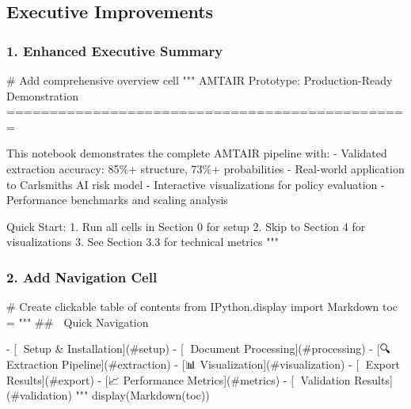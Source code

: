 \documentclass[
  11pt,
  letterpaper,
]{book}
\newenvironment{Shaded}{\begin{snugshade}}{\end{snugshade}}
\newcommand{\CommentTok}[1]{\textcolor[rgb]{0.37,0.37,0.37}{#1}}
\newcommand{\ImportTok}[1]{\textcolor[rgb]{0.00,0.46,0.62}{#1}}
\newcommand{\NormalTok}[1]{\textcolor[rgb]{0.00,0.23,0.31}{#1}}
\newcommand{\OperatorTok}[1]{\textcolor[rgb]{0.37,0.37,0.37}{#1}}
\newcommand{\StringTok}[1]{\textcolor[rgb]{0.13,0.47,0.30}{#1}}
\begin{document}
\subsection{Executive Improvements}\label{executive-improvements}

\subsubsection{1. Enhanced Executive
Summary}\label{enhanced-executive-summary}

\begin{Shaded}
\begin{Highlighting}[]
\CommentTok{\# Add comprehensive overview cell}
\CommentTok{"""}
\CommentTok{AMTAIR Prototype: Production{-}Ready Demonstration}
\CommentTok{===============================================}

\CommentTok{This notebook demonstrates the complete AMTAIR pipeline with:}
\CommentTok{{-} Validated extraction accuracy: 85\%+ structure, 73\%+ probabilities}
\CommentTok{{-} Real{-}world application to Carlsmith\textquotesingle{}s AI risk model}
\CommentTok{{-} Interactive visualizations for policy evaluation}
\CommentTok{{-} Performance benchmarks and scaling analysis}

\CommentTok{Quick Start:}
\CommentTok{1. Run all cells in Section 0 for setup}
\CommentTok{2. Skip to Section 4 for visualizations}
\CommentTok{3. See Section 3.3 for technical metrics}
\CommentTok{"""}
\end{Highlighting}
\end{Shaded}

\subsubsection{2. Add Navigation Cell}\label{add-navigation-cell}

\begin{Shaded}
\begin{Highlighting}[]
\CommentTok{\# Create clickable table of contents}
\ImportTok{from}\NormalTok{ IPython.display }\ImportTok{import}\NormalTok{ Markdown}
\NormalTok{toc }\OperatorTok{=} \StringTok{"""}
\StringTok{\#\# 📍 Quick Navigation}

\StringTok{{-} [🚀 Setup \& Installation](\#setup) }
\StringTok{{-} [📄 Document Processing](\#processing)}
\StringTok{{-} [🔍 Extraction Pipeline](\#extraction)}
\StringTok{{-} [📊 Visualization](\#visualization)}
\StringTok{{-} [💾 Export Results](\#export)}
\StringTok{{-} [📈 Performance Metrics](\#metrics)}
\StringTok{{-} [🔬 Validation Results](\#validation)}
\StringTok{"""}
\NormalTok{display(Markdown(toc))}
\end{Highlighting}
\end{Shaded}
\end{document}
